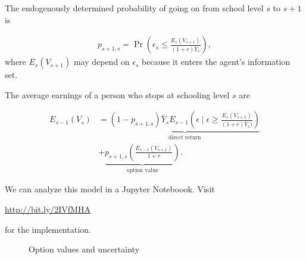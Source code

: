 \begin{frame}
The endogenously determined probability of going on from school level $s$ to $s + 1$ is

\begin{align*}
p_{s + 1, s} = \Pr\left(\epsilon_s \leq \frac{E_s(V_{s + 1})}{(1 + r) \bar{Y}_s}\right),
\end{align*}
where $E_s(V_{s + 1})$ may depend on $\epsilon_s$ because it enters the agent's information set.
\end{frame}
\begin{frame}
The average earnings of a person who stops at schooling level $s$ are

\begin{align*}
E_{s - 1}(V_s) & = \underbrace{(1 - p_{s + 1, s}) \bar{Y}_s E_{s - 1}\left(\epsilon\mid \epsilon \ge \frac{E_s(V_{s + 1})}{(1 + r)\bar{Y}_s)}\right)}_{\text{direct return}} \\
 & + \underbrace{p_{s + 1, s} \left(\frac{E_{s - 1}(V_{s + 1})}{1 + r}\right)}_{\text{option value}}.
\end{align*}
\end{frame}
\begin{frame}
We can analyze this model in a Jupyter Noteboook. Visit
\begin{center}
\url{http://bit.ly/2IVfMHA}
\end{center}
for the implementation.
\end{frame}
\begin{frame}
\begin{figure}[htp]\centering
\caption{Option values and uncertainty}
\end{figure}
\end{frame}
